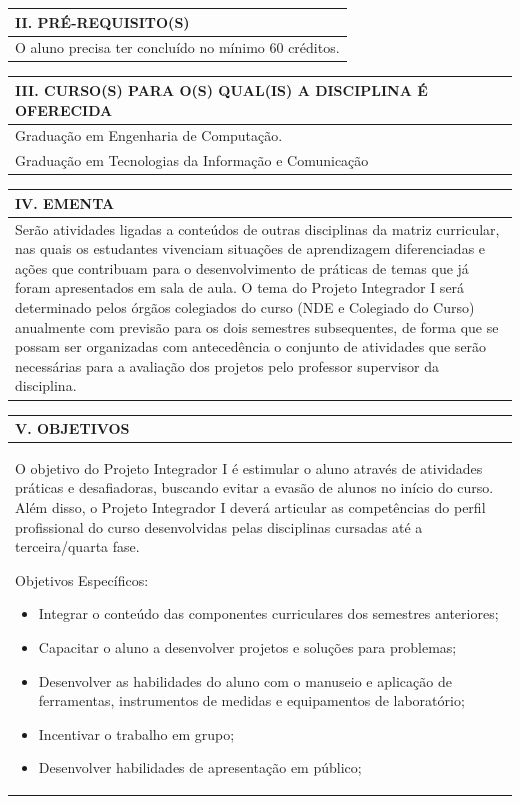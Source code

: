 \documentclass[12pt]{article}
\newcommand{\cursoA}{Graduação em Engenharia de Computação. \\ \hline}
\newcommand{\cursoB}{Graduação em Tecnologias da Informação e Comunicação \\ \hline}
\newcommand{\cursoC}{}
\newcommand{\ementa}{
Serão atividades ligadas a conteúdos de outras disciplinas da matriz curricular, nas quais os estudantes vivenciam situações de aprendizagem diferenciadas e ações que contribuam para o
desenvolvimento de práticas de temas que já foram apresentados em sala de aula. O tema do
Projeto Integrador I será determinado pelos órgãos colegiados do curso (NDE e Colegiado do
Curso) anualmente com previsão para os dois semestres subsequentes, de forma que se possam
ser organizadas com antecedência o conjunto de atividades que serão necessárias para a
avaliação dos projetos pelo professor supervisor da disciplina.
 \\ \hline
}
\begin{document}
\begin{longtable}{|L{1.025\textwidth}|} \hline
%
{\bf II. PRÉ-REQUISITO(S) } \\ \hline
%
O aluno precisa ter concluído no mínimo 60 créditos. \\ \hline

\end{longtable}


\begin{longtable}{|L{1.025\textwidth}|} \hline
%
{\bf III. CURSO(S) PARA O(S) QUAL(IS) A DISCIPLINA É OFERECIDA } \\ \hline
%
\cursoA 
\cursoB
\cursoC

\end{longtable}

\begin{longtable}{|L{1.025\textwidth}|} \hline
%
{\bf IV. EMENTA } \\ \hline
%
\ementa
\end{longtable}

\newpage



\begin{longtable}{|L{1.025\textwidth}|} \hline
%
{\bf V. OBJETIVOS } \\ \hline
%
O objetivo do Projeto Integrador I é estimular o aluno através de atividades práticas e desafiadoras, buscando evitar a evasão de alunos no início do curso. Além disso, o Projeto Integrador I deverá articular as competências do perfil profissional do curso desenvolvidas pelas disciplinas cursadas até a terceira/quarta fase.

Objetivos Específicos: 
\begin{itemize}
    \item Integrar o conteúdo das componentes curriculares dos semestres anteriores;
    \item Capacitar o aluno a desenvolver projetos e soluções para problemas;
    \item Desenvolver as habilidades do aluno com o manuseio e aplicação de ferramentas, instrumentos de medidas e equipamentos de laboratório;
    \item Incentivar o trabalho em grupo;
    \item Desenvolver habilidades de apresentação em público;
    \end{itemize}

\\ \hline
\end{longtable}
\end{document}
